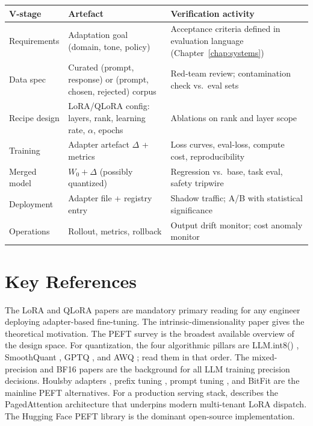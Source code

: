 \begin{center}
\small
\begin{tabular}{p{4.3cm}|p{4.3cm}|p{4.3cm}}
\textbf{V-stage} & \textbf{Artefact} & \textbf{Verification activity}\\\hline
Requirements & Adaptation goal (domain, tone, policy) & Acceptance criteria defined in evaluation language (Chapter~\ref{chap:systems}) \\
Data spec & Curated (prompt, response) or (prompt, chosen, rejected) corpus & Red-team review; contamination check vs.\ eval sets \\
Recipe design & LoRA/QLoRA config: layers, rank, learning rate, $\alpha$, epochs & Ablations on rank and layer scope \\
Training & Adapter artefact $\Delta$ + metrics & Loss curves, eval-loss, compute cost, reproducibility \\
Merged model & $W_0 + \Delta$ (possibly quantized) & Regression vs.\ base, task eval, safety tripwire \\
Deployment & Adapter file + registry entry & Shadow traffic; A/B with statistical significance \\
Operations & Rollout, metrics, rollback & Output drift monitor; cost anomaly monitor \\
\end{tabular}
\end{center}

\section{Key References}

The LoRA and QLoRA papers \citep{hu2021lora, dettmers2023qlora} are
mandatory primary reading for any engineer deploying adapter-based
fine-tuning. The intrinsic-dimensionality paper
\citep{aghajanyan2021intrinsic} gives the theoretical motivation.
The PEFT survey \citep{lialin2023peftsurvey} is the broadest
available overview of the design space.
For quantization, the four algorithmic pillars are LLM.int8()
\citep{dettmers2022llmint8}, SmoothQuant \citep{xiao2023smoothquant},
GPTQ \citep{frantar2023gptq}, and AWQ \citep{lin2024awq}; read them
in that order. The mixed-precision \citep{micikevicius2018mixed}
and BF16 \citep{kalamkar2019bfloat16} papers are the background
for all LLM training precision decisions. Houlsby adapters
\citep{houlsby2019adapters}, prefix tuning \citep{li2021prefix},
prompt tuning \citep{lester2021prompt}, and BitFit
\citep{zaken2022bitfit} are the mainline PEFT alternatives. For a
production serving stack, \citet{kwon2023vllm} describes the
PagedAttention architecture that underpins modern multi-tenant
LoRA dispatch. The Hugging Face PEFT library
\citep{mangrulkar2023peft} is the dominant open-source
implementation.

